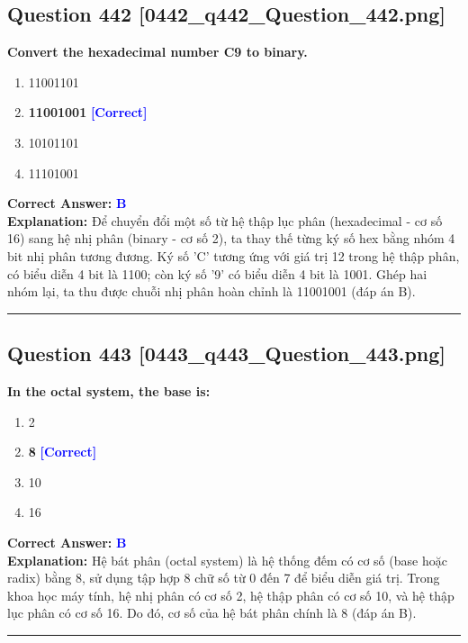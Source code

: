 \documentclass[11pt,a4paper]{article}
\begin{document}
\begin{minipage}{\textwidth}
\subsection*{Question 442 \quad \footnotesize{[0442\_q442\_Question\_442.png]}}
\noindent \textbf{Convert the hexadecimal number C9 to binary.}

\begin{enumerate}[label=\Alph*.]
    \item 11001101
    \item \textbf{11001001} \hfill \textcolor{blue}{\textbf{[Correct]}}
    \item 10101101
    \item 11101001
\end{enumerate}

\noindent \textbf{Correct Answer:} \textcolor{blue}{\textbf{B}} \\[2pt]
\noindent \textbf{Explanation:} Để chuyển đổi một số từ hệ thập lục phân (hexadecimal - cơ số 16) sang hệ nhị phân (binary - cơ số 2), ta thay thế từng ký số hex bằng nhóm 4 bit nhị phân tương đương. Ký số 'C' tương ứng với giá trị 12 trong hệ thập phân, có biểu diễn 4 bit là 1100; còn ký số '9' có biểu diễn 4 bit là 1001. Ghép hai nhóm lại, ta thu được chuỗi nhị phân hoàn chỉnh là 11001001 (đáp án B).

\par\vspace{0.3cm}
\hrule
\vspace{0.3cm}
\end{minipage}

\begin{minipage}{\textwidth}
\subsection*{Question 443 \quad \footnotesize{[0443\_q443\_Question\_443.png]}}
\noindent \textbf{In the octal system, the base is:}

\begin{enumerate}[label=\Alph*.]
    \item 2
    \item \textbf{8} \hfill \textcolor{blue}{\textbf{[Correct]}}
    \item 10
    \item 16
\end{enumerate}

\noindent \textbf{Correct Answer:} \textcolor{blue}{\textbf{B}} \\[2pt]
\noindent \textbf{Explanation:} Hệ bát phân (octal system) là hệ thống đếm có cơ số (base hoặc radix) bằng 8, sử dụng tập hợp 8 chữ số từ 0 đến 7 để biểu diễn giá trị. Trong khoa học máy tính, hệ nhị phân có cơ số 2, hệ thập phân có cơ số 10, và hệ thập lục phân có cơ số 16. Do đó, cơ số của hệ bát phân chính là 8 (đáp án B).

\par\vspace{0.3cm}
\hrule
\vspace{0.3cm}
\end{minipage}
\end{document}

